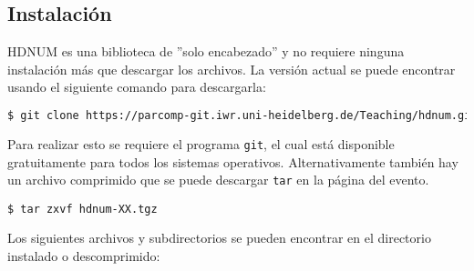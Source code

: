 \documentclass[a4paper,11pt]{article}
\theoremstyle{definition}
\begin{document}
\subsection{Instalación}

HDNUM es una biblioteca de ''solo encabezado'' y no requiere ninguna instalación más que descargar los archivos. La versión actual se puede encontrar usando el siguiente comando para descargarla:

\begin{lstlisting}[basicstyle=\ttfamily\footnotesize,language=bash,frame=single]
$ git clone https://parcomp-git.iwr.uni-heidelberg.de/Teaching/hdnum.git
\end{lstlisting}

Para realizar esto se requiere el programa \lstinline{git}, el cual está disponible gratuitamente para todos los sistemas operativos. Alternativamente también hay un archivo comprimido que se puede descargar \lstinline{tar} en la página del evento.
\begin{lstlisting}[basicstyle=\ttfamily\small,frame=single]
$ tar zxvf hdnum-XX.tgz
\end{lstlisting}
Los siguientes archivos y subdirectorios se pueden encontrar en el directorio instalado o descomprimido:
\end{document}
